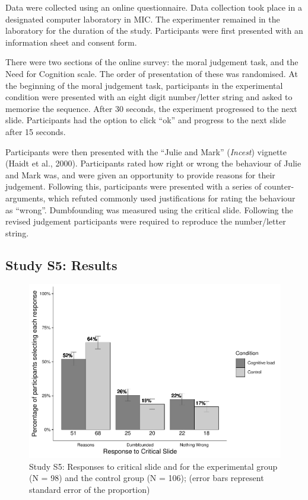 \documentclass[
  man,floatsintext]{apa6}
\begin{document}
Data were collected using an online questionnaire. Data collection took place in a designated computer laboratory in MIC. The experimenter remained in the laboratory for the duration of the study. Participants were first presented with an information sheet and consent form.

There were two sections of the online survey: the moral judgement task, and the Need for Cognition scale. The order of presentation of these was randomised. At the beginning of the moral judgement task, participants in the experimental condition were presented with an eight digit number/letter string and asked to memorise the sequence. After 30 seconds, the experiment progressed to the next slide. Participants had the option to click ``ok'' and progress to the next slide after 15 seconds.

Participants were then presented with the ``Julie and Mark'' (\emph{Incest}) vignette (Haidt et al., 2000). Participants rated how right or wrong the behaviour of Julie and Mark was, and were given an opportunity to provide reasons for their judgement. Following this, participants were presented with a series of counter-arguments, which refuted commonly used justifications for rating the behaviour as ``wrong''. Dumbfounding was measured using the critical slide. Following the revised judgement participants were required to reproduce the number/letter string.

\hypertarget{study-s5-results}{%
\subsection{Study S5: Results}\label{study-s5-results}}

\begin{figure}[!h]
\includegraphics{Supplementary_files/figure-latex/ch5S5fig2criticalcondition-1} \caption{Study S5: Responses to critical slide and for the experimental group (N = 98) and the control group (N = 106); (error bars represent standard error of the proportion)}\label{fig:ch5S5fig2criticalcondition}
\end{figure}
\end{document}

